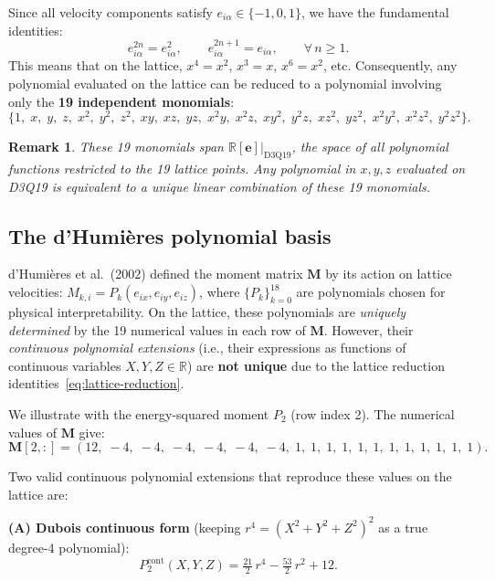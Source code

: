 \documentclass[11pt,a4paper]{article}
\newtheorem{remark}{Remark}[section]
\newcommand{\vect}[1]{\bm{#1}}
\newcommand{\mat}[1]{\bm{#1}}
\newcommand{\Mmat}{\mat{M}}
\newcommand{\Real}{\mathbb{R}}
\begin{document}
Since all velocity components satisfy $e_{i\alpha} \in \{-1,0,1\}$, we have the fundamental identities:
\begin{equation}\label{eq:lattice-reduction}
  \boxed{e_{i\alpha}^{2n} = e_{i\alpha}^2, \qquad e_{i\alpha}^{2n+1} = e_{i\alpha}, \qquad \forall\, n \geq 1.}
\end{equation}
This means that on the lattice, $x^4 = x^2$, $x^3 = x$, $x^6 = x^2$, etc.
Consequently, any polynomial evaluated on the lattice can be reduced to a polynomial involving only the \textbf{19 independent monomials}:
\begin{equation}\label{eq:19-monomials}
  \{1,\; x,\; y,\; z,\; x^2,\; y^2,\; z^2,\; xy,\; xz,\; yz,\; x^2 y,\; x^2 z,\; xy^2,\; y^2 z,\; xz^2,\; yz^2,\; x^2 y^2,\; x^2 z^2,\; y^2 z^2\}.
\end{equation}

\begin{remark}
These 19 monomials span $\Real[\vect{e}]|_{\text{D3Q19}}$, the space of all polynomial functions restricted to the 19 lattice points.
Any polynomial in $x,y,z$ evaluated on D3Q19 is equivalent to a unique linear combination of these 19 monomials.
\end{remark}

\subsection{The d'Humi\`eres polynomial basis}

d'Humi\`eres et al.\ (2002) defined the moment matrix $\Mmat$ by its action on lattice velocities:
$M_{k,i} = P_k(e_{ix}, e_{iy}, e_{iz})$, where $\{P_k\}_{k=0}^{18}$ are polynomials chosen for physical interpretability.
On the lattice, these polynomials are \emph{uniquely determined} by the 19 numerical values in each row of $\Mmat$.
However, their \emph{continuous polynomial extensions} (i.e., their expressions as functions of continuous variables $X,Y,Z \in \Real$) are \textbf{not unique} due to the lattice reduction identities~\eqref{eq:lattice-reduction}.

We illustrate with the energy-squared moment $P_2$ (row index 2).
The numerical values of $\Mmat$ give:
\[
  \Mmat[2,:] = (12,\; -4,\; -4,\; -4,\; -4,\; -4,\; -4,\; 1,\; 1,\; 1,\; 1,\; 1,\; 1,\; 1,\; 1,\; 1,\; 1,\; 1,\; 1).
\]

Two valid continuous polynomial extensions that reproduce these values on the lattice are:

\medskip
\noindent\textbf{(A) Dubois continuous form} (keeping $r^4 = (X^2+Y^2+Z^2)^2$ as a true degree-4 polynomial):
\begin{equation}\label{eq:P2-continuous}
  P_2^{\text{cont}}(X,Y,Z) = \tfrac{21}{2}\,r^4 - \tfrac{53}{2}\,r^2 + 12.
\end{equation}
\end{document}
